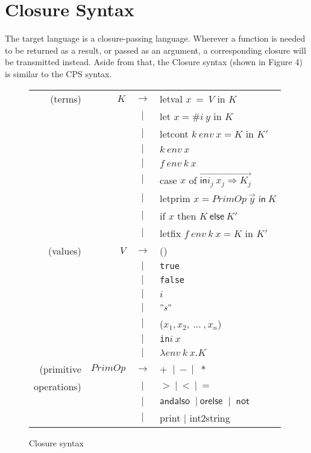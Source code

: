 \documentclass{article}
\theoremstyle{definition}
\theoremstyle{remark}
\numberwithin{equation}{section}
\begin{document}
\section{Closure Syntax}

The target language is a closure-passing language. Wherever
a function is needed to be returned as a result, or passed as an argument,
a corresponding closure will be transmitted instead. Aside from that, the
Closure syntax (shown in Figure 4) is similar to the CPS syntax.


\begin{figure}[!ht]
  \centering
\begin{tabular}{rrcl}
(terms) & $K$ & $\to$ & \textsf{letval }$x\ =\ V$ \textsf{ in } $K$ \\
        &     & $|$ & \textsf{let }$x = \texttt{\#}i\ y$\textsf{ in }$K$\\
        &     & $|$ & \textsf{letcont }$k\ env\ x = K$\textsf{ in }$K'$\\
        &     & $|$ &  $k\ env\ x$ \\
        &     & $|$ & $f\ env\ k\ x$ \\
        &     & $|$ & \textsf{case} $x$ \textsf{of}
             $\overrightarrow{\textsf{in}i_j\ x_j \Rightarrow K_j}$\\
        &     & $|$ & \textsf{letprim} $x=PrimOp\ \vec{y}
         \textsf{ in}\ K$\\
        &     & $|$ &\textsf{if} $x$ \textsf{then} $K\ \textsf{else}\ K'$\\
        &     & $|$ &\textsf{letfix }$f\ env\ k\ x=K$\textsf{ in }$K'$\\

(values) & $V$ & $\to$ & () \\
        &     & $|$ & \texttt{true}\\
        &     & $|$ & \texttt{false}\\
        &     & $|$ & $i$\\
        &     & $|$ & $"s"$\\
        &     & $|$ & ($x_1,x_2,\ ...\ , x_n$)\\
        &     & $|$ & \texttt{in}$i\ x$\\
        &     & $|$ &  $\lambda env\ k\ x.K$ \\

(primitive & $PrimOp$ & $\to$ & $+\ $ $|\ -\ |$ $\ *$\\
operations) &     & $|$ & $>\ |\ <\ |\ =$\\
        &     & $|$ & $\textsf{andalso }\ |\ \textsf{orelse }\ |\ \textsf{ not}$\\
        &     & $|$ & \textsf{print} $|$ \textsf{int2string}\\
\end{tabular}
  \caption{Closure syntax}
  \label{fig-sub}
\end{figure}
\end{document}
